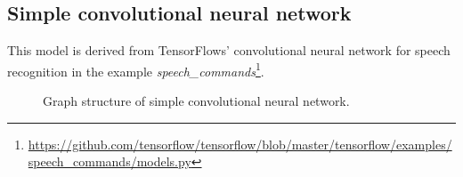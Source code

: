 \subsection*{Simple convolutional neural network}
This model is derived from  TensorFlows' convolutional neural network for speech recognition in the example \textit{speech\_commands}\footnote{\url{https://github.com/tensorflow/tensorflow/blob/master/tensorflow/examples/speech\_commands/models.py}}.
\begin{figure}[h]
	\centering
	\caption[Simple convolutional structure]{Graph structure of simple convolutional neural network.}
\end{figure}
\FloatBarrier

